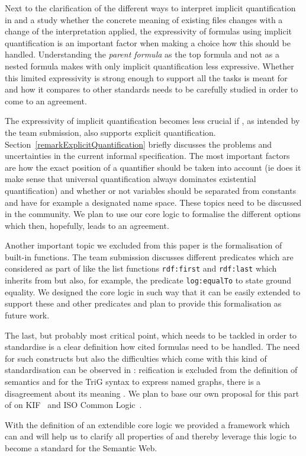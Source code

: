 Next to the clarification of the different ways to interpret implicit quantification in \nthree and a study whether the concrete meaning of existing \nthree files 
changes with a change of the 
interpretation applied, the expressivity of formulas using implicit quantification is an important factor when making a choice how this should be handled. 
Understanding the \emph{parent formula} as the top formula and not as a nested formula makes \nthree with only implicit quantification less expressive. 
Whether this limited expressivity is strong enough to support all the tasks \nthree is meant for and how it compares to other standards needs to be carefully studied 
in order to come to an agreement.

The expressivity of implicit quantification becomes less crucial if \nthree, as intended by the \wwwc team submission, also supports explicit quantification. 
Section~\ref{remarkExplicitQuantification} briefly discusses the problems and uncertainties in the current informal specification. The most important factors are
how the exact position of a quantifier should be taken into account (ie does it make sense that universal quantification always dominates existential quantification) 
and whether or not variables should be separated from constants and have for example a designated name space. These topics need to be discussed in the community. 
We plan to use our core logic to formalise the different options which then, hopefully, leads to an agreement.

Another important topic we excluded from this paper is the formalisation of built-in functions. The \wwwc team submission discusses different predicates which
are considered as part of \nthree like the list functions \texttt{rdf:first} and \texttt{rdf:last} which \nthree inherits from \rdf but also, for example, the predicate 
\texttt{log:equalTo} to state ground equality. We designed the core logic in such way that it can be easily extended to support these and other predicates 
and plan to provide this formalisation as future work.

The last, but probably most critical point, which needs to be tackled in order to standardise \nthree is a clear definition how cited formulas need to be handled. The 
need for such constructs but also the difficulties which come with this kind of standardisation can be observed in \rdf: \rdf reification is excluded 
from the definition of \rdf semantics \cite{RDFSemantics} and 
for the TriG syntax to express named graphs, there is a disagreement about its meaning \cite{TriGsemantics}. We plan to base our own
proposal for 
this part of \nthreelogic on KIF~\cite{kif} and ISO Common Logic~\cite{ICL}.

With the definition of an extendible core logic we provided a framework which can and will help us to clarify all properties of \nthreelogic and thereby
leverage this logic to become a standard for the Semantic Web.
